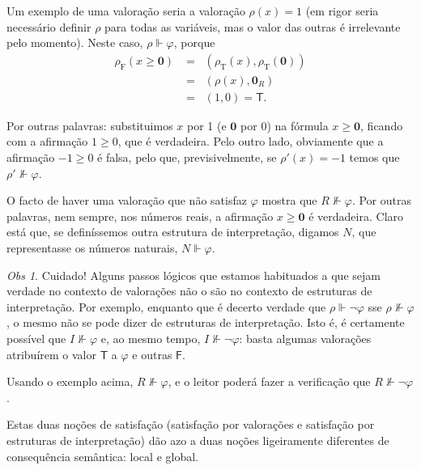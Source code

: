 \documentclass{report}
\theoremstyle{definition}
\theoremstyle{remark}
\newtheorem{obs}{Obs}
\renewcommand{\bf}[1]{\mathbf{#1}}
\newcommand{\F}{\mathrm{F}}
\newcommand{\T}{\mathrm{T}}
\newcommand{\lt}{\mathsf{T}}
\newcommand{\lf}{\mathsf{F}}
\begin{document}
	Um exemplo de uma valoração seria a valoração $\rho(x) = 1$ (em rigor seria necessário definir $\rho$ para todas as variáveis, mas o valor das outras é irrelevante pelo momento). Neste caso, $\rho \Vdash \varphi$, porque
	\begin{align*}
	\rho_\F(x \geq \bf 0) &= \mathop{\geq_R}(\rho_\T(x), \rho_\T(\bf 0))\\
	&= \mathop{\geq_R}(\rho(x), \bf 0_R)\\
	&= \mathop{\geq_R}(1, 0) = \lt.
	\end{align*}
	
	Por outras palavras: substituimos $x$ por 1 (e $\bf 0$ por 0) na fórmula $x \geq \bf 0$, ficando com a afirmação $1 \geq 0$, que é verdadeira. Pelo outro lado, obviamente que a afirmação $-1 \geq 0$ é falsa, pelo que, previsivelmente, se $\rho'(x) = -1$ temos que $\rho' \nVdash \varphi$.

	O facto de haver uma valoração que não satisfaz $\varphi$ mostra que $R \nVdash \varphi$. Por outras palavras, nem sempre, nos números reais, a afirmação $x \geq \bf 0$ é verdadeira. Claro está que, se definíssemos outra estrutura de interpretação, digamos $N$, que representasse os números naturais, $N \Vdash \varphi$.
	
	\begin{obs}\label{structuresatisfactionnotnice}
	Cuidado! Alguns passos lógicos que estamos habituados a que sejam verdade no contexto de valorações não o são no contexto de estruturas de interpretação. Por exemplo, enquanto que é decerto verdade que $\rho \Vdash \neg \varphi$ sse $\rho \nVdash \varphi$, o mesmo não se pode dizer de estruturas de interpretação. Isto é, é certamente possível que $I \nVdash \varphi$ e, ao mesmo tempo, $I \nVdash \neg \varphi$: basta algumas valorações atribuírem o valor $\lt$ a $\varphi$ e outras $\lf$.

	Usando o exemplo acima, $R \nVdash \varphi$, e o leitor poderá fazer a verificação que $R \nVdash \neg \varphi$.
	\end{obs}
	
	Estas duas noções de satisfação (satisfação por valorações e satisfação por estruturas de interpretação) dão azo a duas noções ligeiramente diferentes de consequência semântica: local e global.
	
\end{document}
